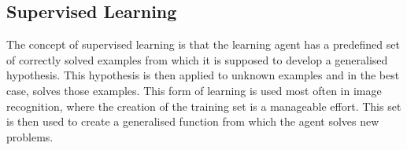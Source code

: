\subsection{Supervised Learning}
The concept of supervised learning is that the learning agent has a predefined set of correctly solved examples from which it is supposed to develop a generalised hypothesis. This hypothesis is then applied to unknown examples and in the best case, solves those examples. This form of learning is used most often in image recognition, where the creation of the training set is  a manageable effort. This set is then used to create a generalised function from which the agent solves new problems. 